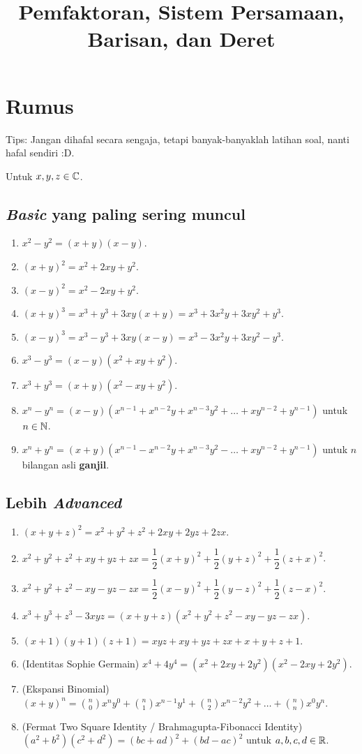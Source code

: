 \documentclass[12pt]{scrartcl}
\title{Pemfaktoran, Sistem Persamaan, Barisan, dan Deret}
\begin{document}
\renewcommand*\contentsname{Daftar Isi}
\tableofcontents

\newpage
{}

\section{Rumus}
Tips: Jangan dihafal secara sengaja, tetapi banyak-banyaklah latihan soal, nanti hafal sendiri :D.
	
Untuk $x,y,z \in \mathbb C$.
    \subsection{\textit{Basic} yang paling sering muncul}
    \begin{enumerate}
        \item $x^2-y^2 = (x+y)(x-y)$.
    \item $(x+y)^2 = x^2+2xy+y^2$.
    \item $(x-y)^2 = x^2-2xy+y^2$.
        \item $(x+y)^3 = x^3+y^3+3xy(x+y) = x^3+3x^2y+3xy^2+y^3$. 
    \item $(x-y)^3 = x^3-y^3+3xy(x-y) = x^3-3x^2y+3xy^2-y^3$. 
    \item $x^3-y^3 = (x-y)(x^2+xy+y^2)$.
    \item $x^3+y^3 = (x+y)(x^2-xy+y^2)$.
    \item $x^n-y^n = (x-y)(x^{n-1}+x^{n-2}y+x^{n-3}y^2+\dots+xy^{n-2}+y^{n-1})$ untuk $n \in \mathbb N$.
    \item $x^n+y^n = (x+y)(x^{n-1}-x^{n-2}y+x^{n-3}y^2-\dots+xy^{n-2}+y^{n-1})$ untuk $n$ bilangan asli \textbf{ganjil}.
    \end{enumerate}

    \subsection{Lebih \textit{Advanced}}
\begin{enumerate}
    \item $(x+y+z)^2 = x^2+y^2+z^2+2xy+2yz+2zx$.
    \item $x^2+y^2+z^2+xy+yz+zx = \dfrac12(x+y)^2+\dfrac12(y+z)^2+\dfrac12(z+x)^2$.
    \item $x^2+y^2+z^2-xy-yz-zx = \dfrac12(x-y)^2+\dfrac12(y-z)^2+\dfrac12(z-x)^2$.
    \item $x^3+y^3+z^3-3xyz = (x+y+z)(x^2+y^2+z^2-xy-yz-zx)$.
    \item $(x+1)(y+1)(z+1)=xyz+xy+yz+zx+x+y+z+1$.
    \item (Identitas Sophie Germain) $x^4+4y^4=(x^2+2xy+2y^2)(x^2-2xy+2y^2)$.
    \item (Ekspansi Binomial) $(x+y)^n = {n \choose 0}x^ny^0 + {n \choose 1}x^{n-1}y^1+{n \choose 2}x^{n-2}y^2 + \dots + {n \choose n}x^0y^n$.
    \item (Fermat Two Square Identity / Brahmagupta-Fibonacci Identity)\\
    $(a^2+b^2)(c^2+d^2)=(bc+ad)^2+(bd-ac)^2$ untuk $a,b,c,d \in \mathbb R$.
\end{enumerate}
\end{document}
